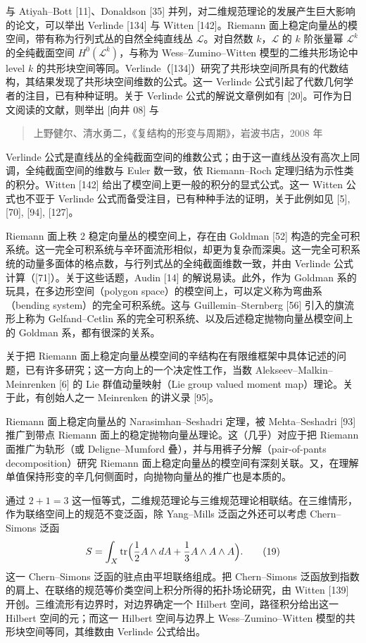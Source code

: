 与 Atiyah–Bott [11]、Donaldson [35] 并列，对二维规范理论的发展产生巨大影响的论文，可以举出 Verlinde [134] 与 Witten [142]。Riemann 面上稳定向量丛的模空间，带有称为行列式丛的自然全纯直线丛 $\mathcal{L}$。对自然数 $k$，$\mathcal{L}$ 的 $k$ 阶张量幂 $\mathcal{L}^k$ 的全纯截面空间 $H^0(\mathcal{L}^k)$，与称为 Wess–Zumino–Witten 模型的二维共形场论中 level $k$ 的共形块空间等同。Verlinde（[134]）研究了共形块空间所具有的代数结构，其结果发现了共形块空间维数的公式。这一 Verlinde 公式引起了代数几何学者的注目，已有种种证明。关于 Verlinde 公式的解说文章例如有 [20]。可作为日文阅读的文献，则举出 [向井 08] 与
\begin{quote}
\noindent [上清 08] 上野健尔、清水勇二，《复结构的形变与周期》，岩波书店，2008 年
\end{quote}
Verlinde 公式是直线丛的全纯截面空间的维数公式；由于这一直线丛没有高次上同调，全纯截面空间的维数与 Euler 数一致，依 Riemann–Roch 定理归结为示性类的积分。Witten [142] 给出了模空间上更一般的积分的显式公式。这一 Witten 公式也不亚于 Verlinde 公式而备受注目，已有种种手法的证明，关于此例如见 [5], [70], [94], [127]。

Riemann 面上秩 2 稳定向量丛的模空间上，存在由 Goldman [52] 构造的完全可积系统。这一完全可积系统与辛环面流形相似，却更为复杂而深奥。这一完全可积系统的动量多面体的格点数，与行列式丛的全纯截面维数一致，并由 Verlinde 公式计算（[71]）。关于这些话题，Audin [14] 的解说易读。此外，作为 Goldman 系的玩具，在多边形空间（polygon space）的模空间上，可以定义称为弯曲系（bending system）的完全可积系统。这与 Guillemin–Sternberg [56] 引入的旗流形上称为 Gelfand–Cetlin 系的完全可积系统、以及后述稳定抛物向量丛模空间上的 Goldman 系，都有很深的关系。

关于把 Riemann 面上稳定向量丛模空间的辛结构在有限维框架中具体记述的问题，已有许多研究；这一方向上的一个决定性工作，当数 Alekseev–Malkin–Meinrenken [6] 的 Lie 群值动量映射（Lie group valued moment map）理论。关于此，有创始人之一 Meinrenken 的讲义录 [95]。

Riemann 面上稳定向量丛的 Narasimhan–Seshadri 定理，被 Mehta–Seshadri [93] 推广到带点 Riemann 面上的稳定抛物向量丛理论。这（几乎）对应于把 Riemann 面推广为轨形（或 Deligne–Mumford 叠），并与用裤子分解（pair-of-pants decomposition）研究 Riemann 面上稳定向量丛的模空间有深刻关联。又，在理解单值保持形变的辛几何侧面时，向抛物向量丛的推广也是本质的。

通过 $2+1=3$ 这一恒等式，二维规范理论与三维规范理论相联结。在三维情形，作为联络空间上的规范不变泛函，除 Yang–Mills 泛函之外还可以考虑 Chern–Simons 泛函
\begin{equation*}
S=\int_X\operatorname{tr}\Bigl(\frac{1}{2}A\wedge dA+\frac{1}{3}A\wedge A\wedge A\Bigr).
\tag{19}
\end{equation*}
这一 Chern–Simons 泛函的驻点由平坦联络组成。把 Chern–Simons 泛函放到指数的肩上、在联络的规范等价类空间上积分所得的拓扑场论研究，由 Witten [139] 开创。三维流形有边界时，对边界确定一个 Hilbert 空间，路径积分给出这一 Hilbert 空间的元；而这一 Hilbert 空间与边界上 Wess–Zumino–Witten 模型的共形块空间等同，其维数由 Verlinde 公式给出。

